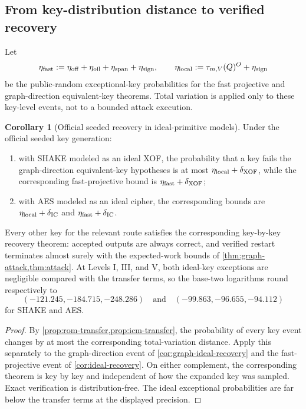 \documentclass[11pt,a4paper]{article}
\theoremstyle{definition}
\newtheorem{corollary}[theorem]{Corollary}
\theoremstyle{remark}
\newcommand{\oil}{\mathrm{oil}}
\newcommand{\off}{\mathrm{off}}
\begin{document}
\subsection{From key-distribution distance to verified recovery}

Let
\[
 \eta_{\rm fast}:=\eta_{\off}+\eta_{\oil}+\eta_{\rm span}+\eta_{\rm sign},
 \qquad
 \eta_{\rm local}:=\tau_{m,V}(Q)^O+\eta_{\rm sign}
\]
be the public-random exceptional-key probabilities for the fast projective and graph-direction equivalent-key theorems.  Total variation is applied only to these key-level events, not to a bounded attack execution.

\begin{corollary}[Official seeded recovery in ideal-primitive models]\label{cor:seeded-ideal-primitives}
Under the official seeded key generation:
\begin{enumerate}
\item with SHAKE modeled as an ideal XOF, the probability that a key fails the graph-direction equivalent-key hypotheses is at most $\eta_{\rm local}+\delta_{\rm XOF}$, while the corresponding fast-projective bound is $\eta_{\rm fast}+\delta_{\rm XOF}$;
\item with AES modeled as an ideal cipher, the corresponding bounds are $\eta_{\rm local}+\delta_{\rm IC}$ and $\eta_{\rm fast}+\delta_{\rm IC}$.
\end{enumerate}
Every other key for the relevant route satisfies the corresponding key-by-key recovery theorem: accepted outputs are always correct, and verified restart terminates almost surely with the expected-work bounds of \cref{thm:graph-attack,thm:attack}.  At Levels I, III, and V, both ideal-key exceptions are negligible compared with the transfer terms, so the base-two logarithms round respectively to
\[
(-121.245,-184.715,-248.286)
\quad\text{and}\quad
(-99.863,-96.655,-94.112)
\]
for SHAKE and AES.
\end{corollary}

\begin{proof}
By \cref{prop:rom-transfer,prop:icm-transfer}, the probability of every key event changes by at most the corresponding total-variation distance.  Apply this separately to the graph-direction event of \cref{cor:graph-ideal-recovery} and the fast-projective event of \cref{cor:ideal-recovery}.  On either complement, the corresponding theorem is key by key and independent of how the expanded key was sampled.  Exact verification is distribution-free.  The ideal exceptional probabilities are far below the transfer terms at the displayed precision.
\end{proof}
\end{document}
